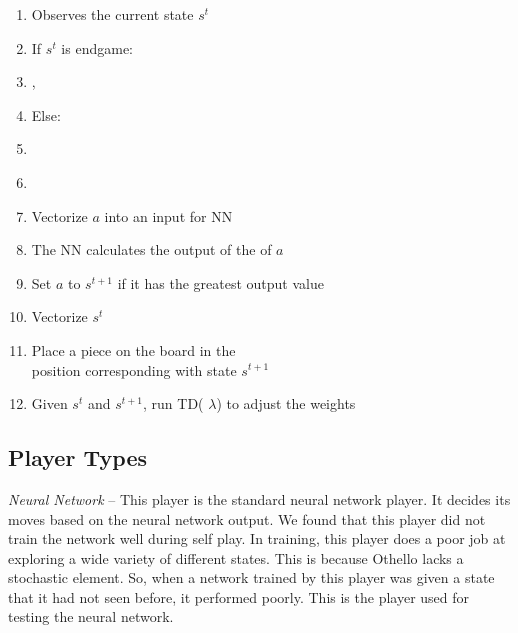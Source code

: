\documentclass{sig-alternate-05-2015}
\begin{document}
\begin{enumerate}
\itemsep0em 
\item Observes the current state $s^t$
\item  If $s^t$ is endgame:
\item  \hspace*{.5cm}, \\  \hspace*{.5cm}
\item   Else:
\item   \hspace*{.5cm} \\  \hspace*{.5cm}
\item   \hspace*{.5cm}
\item  \hspace*{1cm}Vectorize $a$ into an input for NN
\item \hspace*{1cm}The NN calculates the output of the of $a$
\item \hspace*{1cm}Set $a$ to $s^{t+1}$ if it has the greatest output value
\item   \hspace*{.5cm}Vectorize $s^t$
\item   \hspace*{.5cm}Place a piece on the board in the \\ \hspace*{.5cm} position corresponding with state $s^{t+1}$
\item   Given $s^t$ and $s^{t+1}$, run TD( $\lambda$) to adjust the weights
\end{enumerate}


\subsection{Player Types}
\emph{Neural Network} -- This player is the standard neural network player. It decides its moves based on the neural network output. We found that this player did not train the network well during self play. In training, this player does a poor job at exploring a wide variety of different states. This is because Othello lacks a stochastic element. So, when a network trained by this player was given a state that it had not seen before, it performed poorly. This is the player used for testing the neural network.
\end{document}
